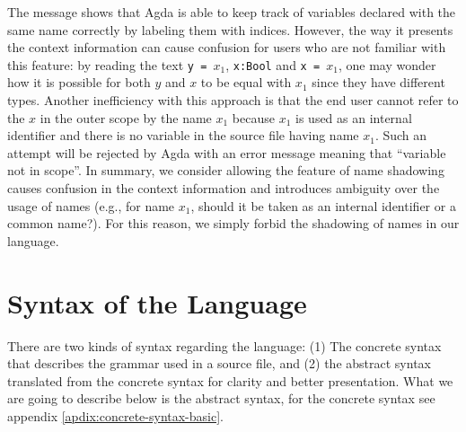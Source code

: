 The message shows that Agda is able to keep track of variables declared with the same name correctly by labeling them with indices. However, the way it presents the context information can cause confusion for users who are not familiar with this feature: by reading the text \texttt{y = $x_1$}, \texttt{x:Bool} and \texttt{x = $x_1$}, one may wonder how it is possible for both $y$ and $x$ to be equal with $x_1$ since they have different types. Another inefficiency with this approach is that the end user cannot refer to the $x$ in the outer scope by the name $x_1$ because $x_1$ is used as an internal identifier and there is no variable in the source file having name $x_1$. Such an attempt will be rejected by Agda with an error message meaning that ``variable not in scope''. In summary, we consider allowing the feature of name shadowing causes confusion in the context information and introduces ambiguity over the usage of names (e.g., for name $x_1$, should it be taken as an internal identifier or a common name?). For this reason, we simply forbid the shadowing of names in our language.

\section{Syntax of the Language}\label{theory:sec:syntax}
There are two kinds of syntax regarding the language: (1) The concrete syntax that describes the grammar used in a source file, and (2) the abstract syntax translated from the concrete syntax for clarity and better presentation. What we are going to describe below is the abstract syntax, for the concrete syntax see appendix \ref{apdix:concrete-syntax-basic}. 

